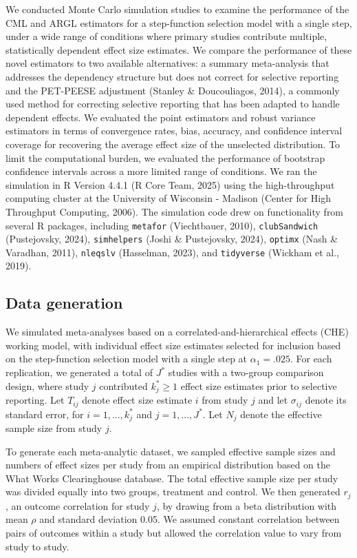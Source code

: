 \documentclass[
  man, donotrepeattitle,floatsintext]{apa7}
\begin{document}
We conducted Monte Carlo simulation studies to examine the performance
of the CML and ARGL estimators for a step-function selection model with a single step, under a wide range of conditions where primary studies contribute multiple, statistically dependent effect size estimates.
We compare the performance of these novel estimators to two available alternatives: a summary meta-analysis that addresses the dependency structure but does not correct for selective reporting and the PET-PEESE adjustment (Stanley \& Doucouliagos, 2014), a commonly used method for correcting selective reporting that has been adapted to handle dependent effects.
We evaluated the point estimators and robust variance estimators in terms of convergence rates, bias, accuracy, and confidence interval coverage for recovering the average effect size of the unselected distribution.
To limit the computational burden, we evaluated the performance of bootstrap confidence intervals across a more limited range of conditions.
We ran the simulation in R Version 4.4.1
(R Core Team, 2025) using the high-throughput computing cluster at the University of Wisconsin - Madison (Center for High Throughput Computing, 2006).
The simulation code drew on functionality from several R packages, including \texttt{metafor} (Viechtbauer, 2010), \texttt{clubSandwich} (Pustejovsky, 2024), \texttt{simhelpers} (Joshi \& Pustejovsky, 2024), \texttt{optimx} (Nash \& Varadhan, 2011), \texttt{nleqslv} (Hasselman, 2023), and \texttt{tidyverse} (Wickham et al., 2019).

\subsection{Data generation}\label{data-generation}

We simulated meta-analyses based on a correlated-and-hierarchical
effects (CHE) working model, with individual effect size estimates selected
for inclusion based on the step-function selection model with a single step at \(\alpha_1 = .025\).
For each replication, we generated a total of \(J^*\) studies with a two-group comparison
design, where study \(j\) contributed \(k_j^* \geq 1\) effect size estimates prior to selective reporting. Let
\(T_{ij}\) denote effect size estimate \(i\) from study \(j\) and let \(\sigma_{ij}\)
denote its standard error, for \(i = 1,...,k_j^*\) and \(j = 1,...,J^*\). Let \(N_j\)
denote the effective sample size from study \(j\).

To generate each meta-analytic dataset, we sampled effective sample sizes and numbers of effect sizes per study from an empirical distribution based on the What Works Clearinghouse database.
The total effective sample size per study was divided equally into two groups, treatment and control.
We then generated \(r_j\), an outcome correlation for study \(j\), by drawing from a beta distribution with mean \(\rho\) and standard deviation 0.05.
We assumed constant correlation between pairs of outcomes within a study but allowed the correlation value to vary from study to study.
\end{document}
